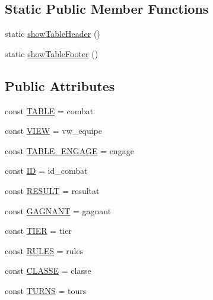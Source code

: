 \subsection*{Static Public Member Functions}
\begin{DoxyCompactItemize}
\item 
static \hyperlink{class_coll_game_a91770bcb8218abf1e7dc0b48d2a0c2d5}{show\+Table\+Header} ()
\item 
static \hyperlink{class_coll_game_aa2b1a672491009ec315adeda42efa46c}{show\+Table\+Footer} ()
\end{DoxyCompactItemize}
\subsection*{Public Attributes}
\begin{DoxyCompactItemize}
\item 
const \hyperlink{class_coll_game_a62d305a47832d3165ad40d839c1b1e54}{T\+A\+B\+LE} = \textquotesingle{}combat\textquotesingle{}
\item 
const \hyperlink{class_coll_game_a3e457569e1db161c5adca582fbe0bfd8}{V\+I\+EW} = \textquotesingle{}vw\+\_\+equipe\textquotesingle{}
\item 
const \hyperlink{class_coll_game_a08f8c00b1a63643215180a53ab0578f2}{T\+A\+B\+L\+E\+\_\+\+E\+N\+G\+A\+GE} = \textquotesingle{}engage\textquotesingle{}
\item 
const \hyperlink{class_coll_game_a2a905bd73e9df3cdeae487ec4cfe6292}{ID} = \textquotesingle{}id\+\_\+combat\textquotesingle{}
\item 
const \hyperlink{class_coll_game_a1ebe4ea6067daab0bf58d8d8570f9754}{R\+E\+S\+U\+LT} = \textquotesingle{}resultat\textquotesingle{}
\item 
const \hyperlink{class_coll_game_aba383596c1c7d5b075e90ee96eeb1dba}{G\+A\+G\+N\+A\+NT} = \textquotesingle{}gagnant\textquotesingle{}
\item 
const \hyperlink{class_coll_game_a8a76a1f6c7d1186c426c1139ba5818ab}{T\+I\+ER} = \textquotesingle{}tier\textquotesingle{}
\item 
const \hyperlink{class_coll_game_a0c93bdda1203ad2341dea52bd404da0e}{R\+U\+L\+ES} = \textquotesingle{}rules\textquotesingle{}
\item 
const \hyperlink{class_coll_game_a18c71e70df099217cb74102eb31e3976}{C\+L\+A\+S\+SE} = \textquotesingle{}classe\textquotesingle{}
\item 
const \hyperlink{class_coll_game_a9382591780bedeaec6f403ea5e88a33c}{T\+U\+R\+NS} = \textquotesingle{}tours\textquotesingle{}
\end{DoxyCompactItemize}
